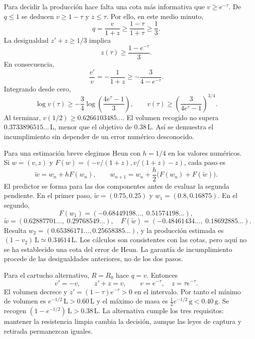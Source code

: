 Para decidir la producción hace falta una cota más informativa que \(v\ge e^{-\tau}\). De \(q\le1\) se deducen \(v\ge1-\tau\) y \(z\le\tau\). Por ello, en este medio minuto,
\[
q=\frac{v}{1+z}\ge\frac{1-\tau}{1+\tau}\ge\frac13.
\]
La desigualdad \(z'+z\ge1/3\) implica
\[
z(\tau)\ge\frac{1-e^{-\tau}}3.
\]
En consecuencia,
\[
\frac{v'}v=-\frac1{1+z}\ge-\frac3{4-e^{-\tau}}.
\]
Integrando desde cero,
\[
\log v(\tau)\ge-\frac34\log\left(\frac{4e^\tau-1}{3}\right),
\qquad
v(\tau)\ge\left(\frac3{4e^\tau-1}\right)^{3/4}.
\]
Al terminar, \(v(1/2)\ge0.6266103485\ldots\). El volumen recogido no supera \(0.3733896515\ldots\,\mathrm L\), menor que el objetivo de \(0.38\,\mathrm L\). Así se demuestra el incumplimiento sin depender de un error numérico desconocido.

Para una estimación breve elegimos Heun con \(h=1/4\) en los valores numéricos. Si \(w=(v,z)\) y \(F(w)=(-v/(1+z),v/(1+z)-z)\), cada paso es
\[
\widetilde w=w_n+hF(w_n),\qquad
w_{n+1}=w_n+\frac h2\bigl(F(w_n)+F(\widetilde w)\bigr).
\]
El predictor se forma para las dos componentes antes de evaluar la segunda pendiente. En el primer paso, \(\widetilde w=(0.75,0.25)\) y \(w_1=(0.8,0.16875)\). En el segundo,
\[
F(w_1)=(-0.68449198\ldots,\;0.51574198\ldots),
\]
\[
\widetilde w=(0.62887701\ldots,\;0.29768549\ldots),
\quad F(\widetilde w)=(-0.48461434\ldots,\;0.18692885\ldots).
\]
Resulta \(w_2=(0.65386171\ldots,0.25658385\ldots)\), y la producción estimada es \((1-v_2)\,\mathrm L\simeq0.34614\,\mathrm L\). Los cálculos son consistentes con las cotas, pero aquí no se ha establecido una cota del error de Heun. La garantía de incumplimiento procede de las desigualdades anteriores, no de los dos pasos.

Para el cartucho alternativo, \(R=R_0\) hace \(q=v\). Entonces
\[
v'=-v,\qquad z'+z=v,
\qquad v=e^{-\tau},\quad z=\tau e^{-\tau}.
\]
El volumen decrece y \(z'=(1-\tau)e^{-\tau}>0\) en el intervalo. Por tanto el mínimo de volumen es \(e^{-1/2}\,\mathrm L>0.60\,\mathrm L\) y el máximo de masa es \(\tfrac12e^{-1/2}\,\mathrm g<0.40\,\mathrm g\). Se recogen \((1-e^{-1/2})\,\mathrm L>0.38\,\mathrm L\). La alternativa cumple los tres requisitos: mantener la resistencia limpia cambia la decisión, aunque las leyes de captura y retirada permanezcan iguales.
